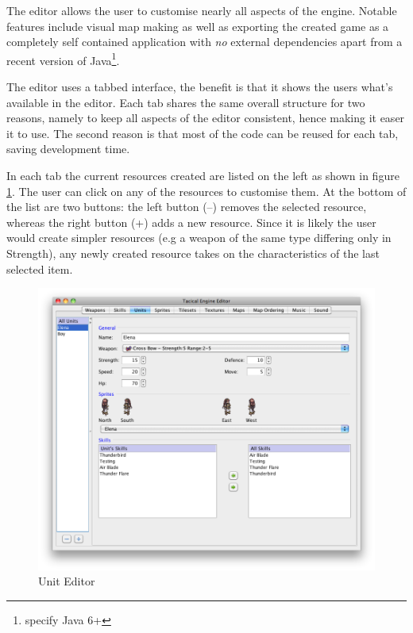 The editor allows the user to customise nearly all aspects of the engine.  Notable features include visual map making as well as exporting the created game as a completely self contained application with \emph{no} external dependencies apart from a recent version of Java\footnote{specify Java 6+}. 

The editor uses a tabbed interface, the benefit is that it shows the users what's available in the editor. Each tab shares the same overall structure for two reasons, namely to keep all aspects of the editor consistent, hence making it easer it to use. The second reason is that most of the code can be reused for each tab, saving development time. 

In each tab the current resources created are listed on the left as shown in figure \ref{fig:figures_editor_Units}. The user can click on any of the resources to customise them. At the bottom of the list are two buttons: the left button (--) removes the selected resource, whereas the right button (+) adds a new resource. Since it is likely the user would create simpler resources (e.g  a weapon of the same type differing only in Strength), any newly created resource takes on the characteristics of the last selected item.

\begin{figure}[htbp]
	\centering
		\includegraphics[width=\textwidth]{figures/editor/Units.png}
	\caption{Unit Editor}
	\label{fig:figures_editor_Units}
\end{figure}

